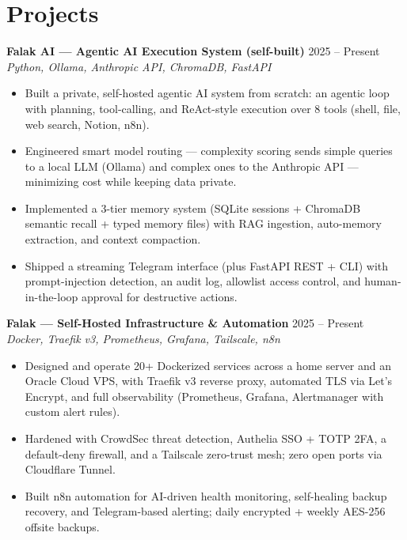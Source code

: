\documentclass[9pt, letterpaper]{extarticle}
\newcommand{\projectentry}[3]{
  \textbf{#1} \hfill \textcolor{subtle}{\small #2} \\
  \textit{\small\textcolor{subtle}{#3}}
}
\begin{document}
\section{Projects}

\projectentry{Falak AI --- Agentic AI Execution System (self-built)}
             {2025 -- Present}
             {Python, Ollama, Anthropic API, ChromaDB, FastAPI}
\begin{itemize}
  \item Built a private, self-hosted agentic AI system from scratch: an agentic loop with planning, tool-calling, and ReAct-style execution over 8 tools (shell, file, web search, Notion, n8n).
  \item Engineered smart model routing --- complexity scoring sends simple queries to a local LLM (Ollama) and complex ones to the Anthropic API --- minimizing cost while keeping data private.
  \item Implemented a 3-tier memory system (SQLite sessions + ChromaDB semantic recall + typed memory files) with RAG ingestion, auto-memory extraction, and context compaction.
  \item Shipped a streaming Telegram interface (plus FastAPI REST + CLI) with prompt-injection detection, an audit log, allowlist access control, and human-in-the-loop approval for destructive actions.
\end{itemize}

\vspace{1pt}

\projectentry{Falak --- Self-Hosted Infrastructure \& Automation}
             {2025 -- Present}
             {Docker, Traefik v3, Prometheus, Grafana, Tailscale, n8n}
\begin{itemize}
  \item Designed and operate 20+ Dockerized services across a home server and an Oracle Cloud VPS, with Traefik v3 reverse proxy, automated TLS via Let's Encrypt, and full observability (Prometheus, Grafana, Alertmanager with custom alert rules).
  \item Hardened with CrowdSec threat detection, Authelia SSO + TOTP 2FA, a default-deny firewall, and a Tailscale zero-trust mesh; zero open ports via Cloudflare Tunnel.
  \item Built n8n automation for AI-driven health monitoring, self-healing backup recovery, and Telegram-based alerting; daily encrypted + weekly AES-256 offsite backups.
\end{itemize}
\end{document}
